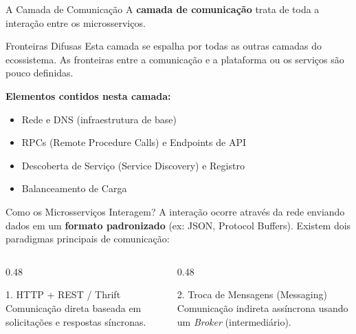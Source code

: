 \documentclass[aspectratio=169]{beamer}
\begin{document}
\begin{frame}{A Camada de Comunicação}
    A \textbf{camada de comunicação} trata de toda a interação entre os microsserviços.
    \vspace{0.3cm}
    \begin{alertblock}{Fronteiras Difusas}
        Esta camada se espalha por todas as outras camadas do ecossistema. As fronteiras entre a comunicação e a plataforma ou os serviços são pouco definidas.
    \end{alertblock}
    \vspace{0.3cm}
    \textbf{Elementos contidos nesta camada:}
    \begin{itemize}
        \item Rede e DNS (infraestrutura de base)
        \item RPCs (Remote Procedure Calls) e Endpoints de API
        \item Descoberta de Serviço (Service Discovery) e Registro
        \item Balanceamento de Carga
    \end{itemize}
\end{frame}

\begin{frame}{Como os Microsserviços Interagem?}
    A interação ocorre através da rede enviando dados em um \textbf{formato padronizado} (ex: JSON, Protocol Buffers).
    \vspace{0.4cm}
    Existem dois paradigmas principais de comunicação:
    \vspace{0.3cm}
    \begin{columns}
        \begin{column}{0.48\textwidth}
            \begin{block}{1. HTTP + REST / Thrift}
                Comunicação direta baseada em solicitações e respostas síncronas.
            \end{block}
        \end{column}
        \begin{column}{0.48\textwidth}
            \begin{block}{2. Troca de Mensagens (Messaging)}
                Comunicação indireta assíncrona usando um \textit{Broker} (intermediário).
            \end{block}
        \end{column}
    \end{columns}
\end{frame}
\end{document}
